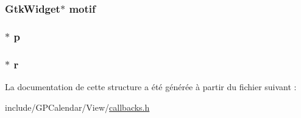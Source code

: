 \hypertarget{struct_data_r_d_v_ae22ca5875ee8b6bdccaa89afda5779a4}{
\subsubsection[{motif}]{\setlength{\rightskip}{0pt plus 5cm}Gtk\-Widget$\ast$ motif}}\label{struct_data_r_d_v_ae22ca5875ee8b6bdccaa89afda5779a4}
\hypertarget{struct_data_r_d_v_a537ec1a4e0cf2f81d81bf4da1a0a3f2f}{
\subsubsection[{p}]{$\ast$ p}}\label{struct_data_r_d_v_a537ec1a4e0cf2f81d81bf4da1a0a3f2f}
\hypertarget{struct_data_r_d_v_a017a2a103427c89eebac9921f00620ab}{
\subsubsection[{r}]{$\ast$ r}}\label{struct_data_r_d_v_a017a2a103427c89eebac9921f00620ab}


La documentation de cette structure a été générée à partir du fichier suivant \-:\begin{DoxyCompactItemize}
\item 
include/\-G\-P\-Calendar/\-View/\hyperlink{callbacks_8h}{callbacks.\-h}\end{DoxyCompactItemize}
